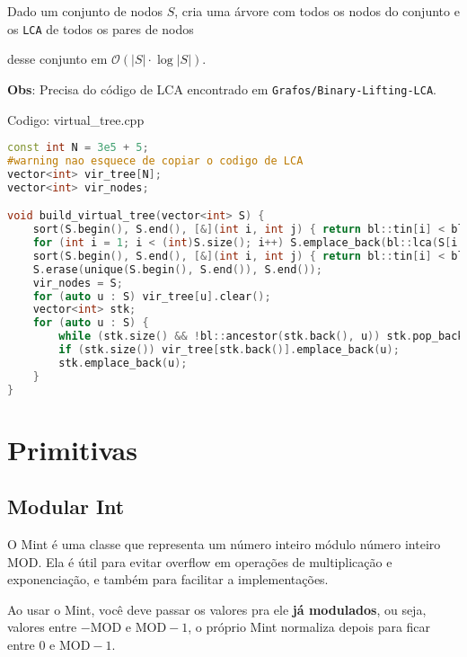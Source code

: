 \documentclass[10pt, a4paper, oneside]{book}
\begin{document}
Dado um conjunto de nodos $S$, cria uma árvore com todos os nodos do conjunto e os \texttt{LCA} de todos os pares de nodos

desse conjunto em $\mathcal{O}(|S| \cdot \log  |S|)$.



\textbf{Obs}: Precisa do código de LCA encontrado em \texttt{Grafos/Binary-Lifting-LCA}.

\hfill

Codigo: virtual\_tree.cpp

\begin{lstlisting}[language=C++]
const int N = 3e5 + 5;
#warning nao esquece de copiar o codigo de LCA
vector<int> vir_tree[N];
vector<int> vir_nodes;

void build_virtual_tree(vector<int> S) {
    sort(S.begin(), S.end(), [&](int i, int j) { return bl::tin[i] < bl::tin[j]; });
    for (int i = 1; i < (int)S.size(); i++) S.emplace_back(bl::lca(S[i - 1], S[i]));
    sort(S.begin(), S.end(), [&](int i, int j) { return bl::tin[i] < bl::tin[j]; });
    S.erase(unique(S.begin(), S.end()), S.end());
    vir_nodes = S;
    for (auto u : S) vir_tree[u].clear();
    vector<int> stk;
    for (auto u : S) {
        while (stk.size() && !bl::ancestor(stk.back(), u)) stk.pop_back();
        if (stk.size()) vir_tree[stk.back()].emplace_back(u);
        stk.emplace_back(u);
    }
}
\end{lstlisting}
\hfill

\newpage

%
%
%
%

\chapter{Primitivas}

\section{Modular Int}


O Mint é uma classe que representa um número inteiro módulo número inteiro $\text{MOD}$. Ela é útil para evitar overflow em operações de multiplicação e exponenciação, e também para facilitar a implementações.



Ao usar o Mint, você deve passar os valores pra ele \textbf{já modulados}, ou seja, valores entre $-\text{MOD}$ e $\text{MOD}-1$, o próprio Mint normaliza depois para ficar entre $0$ e $\text{MOD}-1$.
\end{document}
